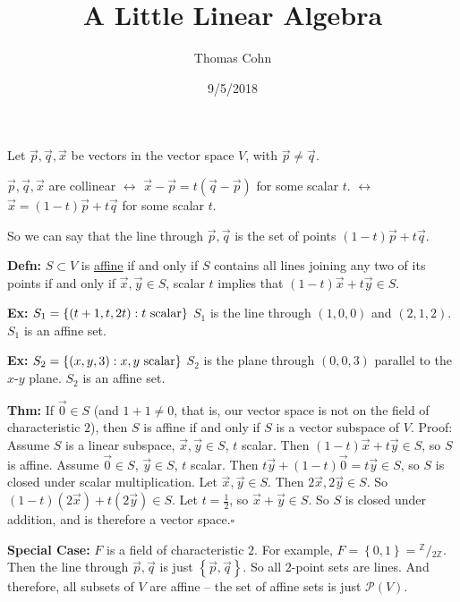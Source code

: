 \documentclass[10pt,letterpaper]{article}
\author{Thomas Cohn}
\title{A Little Linear Algebra}
\date{9/5/2018} %
\newcommand{\n}{\hfill\break}
\newcommand{\defn}[1]{\par\noindent\settowidth{\hangindent}{\textbf{Defn: }}\textbf{Defn: }#1\n}
\newcommand{\thm}[1]{\par\noindent\settowidth{\hangindent}{\textbf{Thm: }}\textbf{Thm: }#1\n}
\newcommand{\ex}[1]{\par\noindent\settowidth{\hangindent}{\textbf{Ex: }}\textbf{Ex: }#1\n}
\newcommand{\proven}{\;$\square$\n}
\newcommand{\ptxt}[1]{\textrm{\textnormal{#1}}}
\newcommand{\set}[1]{\left\{#1\right\}}
\newcommand{\ps}[1]{\mathcal{P}(#1)}
\newcommand{\integers}{\mathbb{Z}}
\newcommand{\Z}{\integers}
\begin{document}
\maketitle
\setlength\RaggedRightParindent{\parindent}
\RaggedRight

\par\noindent Let $\vec{p},\vec{q},\vec{x}$ be vectors in the vector space $V$, with $\vec{p}\ne\vec{q}$.\n

\par\noindent $\vec{p},\vec{q},\vec{x}$ are collinear $\leftrightarrow$ $\vec{x}-\vec{p}=t(\vec{q}-\vec{p})$ for some scalar $t$.\n
{}$\leftrightarrow$ $\vec{x}=(1-t)\vec{p}+t\vec{q}$ for some scalar $t$.\n

\par\noindent So we can say that the line through $\vec{p},\vec{q}$ is the set of points $(1-t)\vec{p}+t\vec{q}$.\n

\defn{$S\subset{}V$ is \underline{affine} if and only if $S$ contains all lines joining any two of its points if and only if $\vec{x},\vec{y}\in{}S$, scalar $t$ implies that $(1-t)\vec{x}+t\vec{y}\in{}S$.}

\ex{$S_{1}=\set{(t+1,t,2t):t\ptxt{ scalar}}$\n
$S_{1}$ is the line through $(1,0,0)$ and $(2,1,2)$.\n
$S_{1}$ is an affine set.}

\ex{$S_{2}=\set{(x,y,3):x,y\ptxt{ scalar}}$\n
$S_{2}$ is the plane through $(0,0,3)$ parallel to the $x$-$y$ plane.\n
$S_{2}$ is an affine set.}

\thm{If $\vec{0}\in{}S$ (and $1+1\ne{}0$, that is, our vector space is not on the field of characteristic $2$), then $S$ is affine if and only if $S$ is a vector subspace of $V$.\n
Proof: Assume $S$ is a linear subspace, $\vec{x},\vec{y}\in{}S$, $t$ scalar. Then $(1-t)\vec{x}+t\vec{y}\in{}S$, so $S$ is affine.\n
\phantom{Proof: }Assume $\vec{0}\in{}S$, $\vec{y}\in{}S$, $t$ scalar. Then $t\vec{y}+(1-t)\vec{0}=t\vec{y}\in{}S$, so $S$ is closed under scalar\n
\phantom{Proof: }multiplication. Let $\vec{x},\vec{y}\in{}S$. Then $2\vec{x},2\vec{y}\in{}S$. So $(1-t)(2\vec{x})+t(2\vec{y})\in{}S$. Let $t=\frac{1}{2}$, so\n
\phantom{Proof: }$\vec{x}+\vec{y}\in{}S$. So $S$ is closed under addition, and is therefore a vector space.\proven}

\par\noindent\textbf{Special Case:} $F$ is a field of characteristic $2$. For example, $F=\set{0,1}={}^{\Z}/{}_{2\Z}$. Then the line through $\vec{p},\vec{q}$ is just $\set{\vec{p},\vec{q}}$. So all $2$-point sets are lines. And therefore, all subsets of $V$ are affine -- the set of affine sets is just $\ps{V}$.\n
\end{document}
